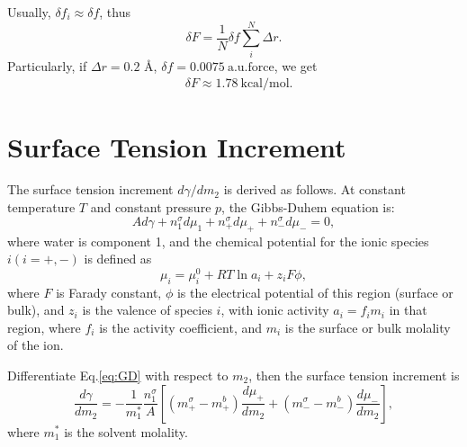 Usually, $\delta{f_i}\approx\delta{f}$, thus
\begin{equation}
  \delta{F} = \frac{1}{N}\delta{f}\sum_{i}^{N}{\Delta{r}}.
\label{eq:dleta_f-2}
\end{equation}
Particularly, if $\Delta{r}= 0.2$ \AA, $\delta{f}=0.0075\ \text{a.u.force}$, we get 
\begin{equation}
\begin{split}
  &\delta{F} \approx 1.78\ \text{kcal/mol}.\nonumber
\end{split}
\label{eq:dleta_f-3}
\end{equation}

\section{Surface Tension Increment}\label{surface_tension_increment}
The surface tension increment $d\gamma/{dm_2}$ is derived as follows.
At constant temperature $T$ and constant pressure $p$, the Gibbs-Duhem equation is: \cite{Pegram2006}
\begin{equation}
Ad\gamma+n_1^{\sigma}d\mu_1 + {n_+^{\sigma}d\mu_+} + {n_-^{\sigma}d\mu_-} =0,
\label{eq:GD}
\end{equation}
where water is component 1, and the chemical potential for the ionic species $i(i=+,-)$ is defined as 
\begin{equation}
\mu_i =\mu_i^0+RT\ln{a}_i+z_iF\phi,
\label{eq:GDb}
\end{equation}
where $F$ is Farady constant, $\phi$ is the electrical potential of this region (surface or bulk), and $z_i$ is the valence of species $i$, with ionic 
activity $a_i=f_im_i$ in that region, where $f_i$ is the activity coefficient, and $m_i$ is the surface or bulk molality of the ion.

Differentiate Eq.\thinspace\ref{eq:GD} with respect to $m_2$, then
the surface tension increment is
\begin{equation}
\frac{d\gamma}{dm_2} = -\frac{1}{m_1^*}\frac{n_1^{\sigma}}{A} [(m_+^{\sigma} -m_+^{b})\frac{d\mu_+}{dm_2} + (m_-^{\sigma} -m_-^b)\frac{d\mu_-}{dm_2}],
\label{eq:h}
\end{equation}
where $m_1^*$ is the solvent molality. 

